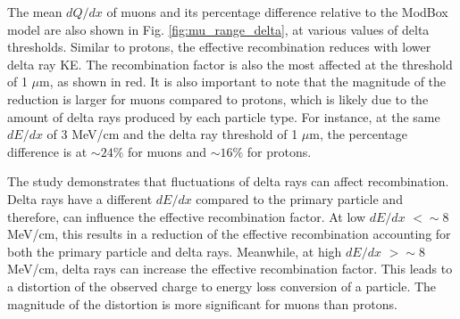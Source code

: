 The mean $dQ/dx$ of muons and its percentage difference relative to the ModBox model are also shown in Fig. \ref{fig:mu_range_delta}, at various values of delta thresholds.
Similar to protons, the effective recombination reduces with lower delta ray KE.
The recombination factor is also the most affected at the threshold of 1 $\mu$m, as shown in red.
It is also important to note that the magnitude of the reduction is larger for muons compared to protons, which is likely due to the amount of delta rays produced by each particle type.
For instance, at the same $dE/dx$ of 3 MeV/cm and the delta ray threshold of 1 $\mu$m, the percentage difference is at $\sim 24\%$ for muons and $\sim16\%$ for protons.  

The study demonstrates that fluctuations of delta rays can affect recombination.
Delta rays have a different $dE/dx$ compared to the primary particle and therefore, can influence the effective recombination factor.
At low $dE/dx$ $< \sim 8$ MeV/cm, this results in a reduction of the effective recombination accounting for both the primary particle and delta rays.
Meanwhile, at high $dE/dx$ $> \sim 8$ MeV/cm, delta rays can increase the effective recombination factor.
This leads to a distortion of the observed charge to energy loss conversion of a particle. 
The magnitude of the distortion is more significant for muons than protons.

